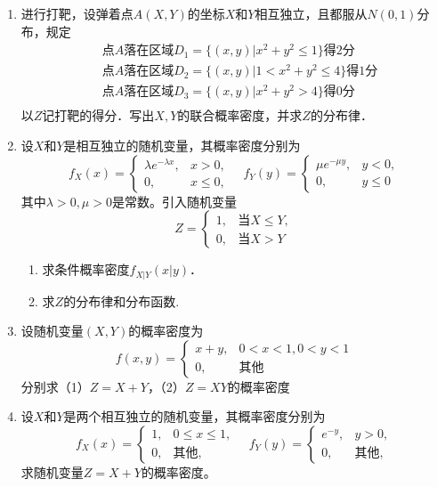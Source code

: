 \documentclass[10pt,a4paper]{article}
\begin{document}
\begin{enumerate}
     \item 进行打靶，设弹着点$A(X,Y)$的坐标$X$和$Y$相互独立，且都服从$N(0,1)$分布，规定
    \begin{equation}
        \begin{aligned}
        \nonumber
        &\text{点}A\mbox{落在区域}D_1=\{(x,y)|x^2+y^2\leq 1\}\mbox{得}2\mbox{分}\\
        &\mbox{点}A\mbox{落在区域}D_2=\{(x,y)|1<x^2+y^2\leq 4\}\mbox{得}1\mbox{分}\\
        &\mbox{点}A\mbox{落在区域}D_3=\{(x,y)|x^2+y^2>4\}\mbox{得}0\mbox{分}\\              
        \end{aligned}
    \end{equation}
    以$Z$记打靶的得分．写出$X,Y$的联合概率密度，并求$Z$的分布律．


    \item 设$X$和$Y$是相互独立的随机变量，其概率密度分别为
    $$f_X(x)=\left\{\begin{array}{ll}
        \lambda e^{-\lambda x}, & x>0,\\
        0, & x\leq 0,
    \end{array}\right.\quad
    f_Y(y)=\left\{\begin{array}{ll}
        \mu e^{-\mu y}, & y<0,\\
        0, & y\leq 0
    \end{array}\right.$$
    其中$\lambda>0,\mu>0$是常数。引入随机变量
    $$Z=\left\{\begin{array}{ll}
        1, & \mbox{当}X\leq Y,\\
        0, & \mbox{当}X>Y
    \end{array}\right.$$
    \begin{enumerate}
        \item 求条件概率密度$f_{X|Y}(x|y)$．
        \item 求$Z$的分布律和分布函数.
    \end{enumerate}
     


    \item 设随机变量$(X,Y)$的概率密度为
    $$f(x,y)=\left\{\begin{array}{ll}
        x+y, & 0<x<1,0<y<1\\
        0, & \mbox{其他}
    \end{array}\right.$$
    分别求（1）$Z=X+Y$，（2）$Z=XY$的概率密度


    \item 设$X$和$Y$是两个相互独立的随机变量，其概率密度分别为
    $$f_X(x)=\left\{\begin{array}{ll}
        1, & 0\leq x\leq 1,\\
        0, & \mbox{其他},
    \end{array}\right.\quad
    f_Y(y)=\left\{\begin{array}{ll}
        e^{-y}, & y>0,\\
        0, & \mbox{其他},
    \end{array}\right.$$
    求随机变量$Z=X+Y$的概率密度。


\end{enumerate}
\end{document}
